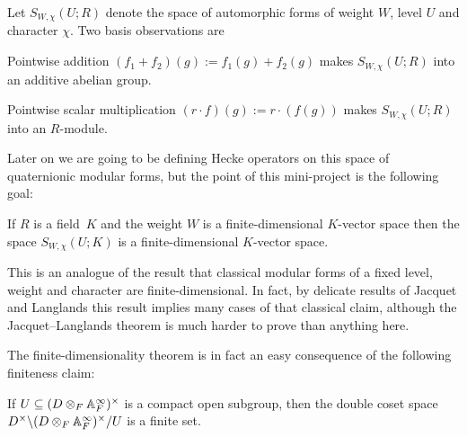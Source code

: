Let $S_{W,\chi}(U;R)$ denote the space of automorphic forms of weight $W$, level $U$ and character
$\chi$. Two basis observations are

\begin{definition}
  \label{TotallyDefiniteQuaternionAlgebra.AutomorphicForm.addCommGroup}
  \leanok
  Pointwise addition $(f_1+f_2)(g):=f_1(g)+f_2(g)$ makes $S_{W,\chi}(U;R)$ into an additive
  abelian group.
\end{definition}

\begin{definition}
  \label{TotallyDefiniteQuaternionAlgebra.AutomorphicForm.module}
  \leanok
  Pointwise scalar multiplication $(r\cdot f)(g):= r\cdot(f(g))$ makes
  $S_{W,\chi}(U;R)$ into an $R$-module.
\end{definition}

  Later on we are going to be defining Hecke operators on this space of quaternionic modular
  forms, but the point of this mini-project is the following goal:

\begin{theorem}
  \label{TotallyDefiniteQuaternionAlgebra.AutomorphicForm.finiteDimensional}
  If $R$ is a field~$K$ and the weight $W$ is a finite-dimensional $K$-vector space
  then the space $S_{W,\chi}(U;K)$ is a finite-dimensional $K$-vector space.
\end{theorem}

This is an analogue of the result that classical modular forms of a fixed
level, weight and character are finite-dimensional. In fact, by delicate results
of Jacquet and Langlands this result implies many cases of that classical claim,
although the Jacquet--Langlands theorem is much harder to prove than anything
here.

The finite-dimensionality theorem is in fact an easy consequence of the following finiteness claim:
\begin{theorem}
  \label{TotallyDefiniteQuaternionAlgebra.finiteDoubleCoset}
  If $U\subseteq (D\otimes_F\mathbb{A}_F^\infty)^\times$ is a compact open subgroup,
  then the double coset space $D^\times\backslash(D\otimes_F\mathbb{A}_F^\infty)^\times/U$ is a
  finite set.
\end{theorem}

